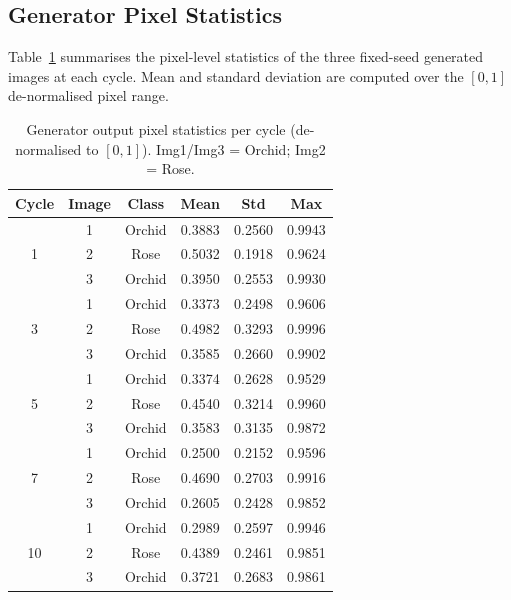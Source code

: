 \documentclass[conference]{IEEEtran}
\begin{document}
\subsection{Generator Pixel Statistics}
\label{ssec:pixel}

Table~\ref{tab:pixstats} summarises the pixel-level statistics of the three fixed-seed generated images at each cycle. Mean and standard deviation are computed over the $[0,1]$ de-normalised pixel range.

\begin{table}[h]
  \centering
  \caption{Generator output pixel statistics per cycle (de-normalised to $[0,1]$). Img1/Img3 = Orchid; Img2 = Rose.}
  \label{tab:pixstats}
  \begin{tabular}{cccccc}
    \toprule
    \textbf{Cycle} & \textbf{Image} & \textbf{Class} & \textbf{Mean} & \textbf{Std} & \textbf{Max} \\
    \midrule
    \multirow{3}{*}{1}  & 1 & Orchid & 0.3883 & 0.2560 & 0.9943 \\
                         & 2 & Rose   & 0.5032 & 0.1918 & 0.9624 \\
                         & 3 & Orchid & 0.3950 & 0.2553 & 0.9930 \\
    \midrule
    \multirow{3}{*}{3}  & 1 & Orchid & 0.3373 & 0.2498 & 0.9606 \\
                         & 2 & Rose   & 0.4982 & 0.3293 & 0.9996 \\
                         & 3 & Orchid & 0.3585 & 0.2660 & 0.9902 \\
    \midrule
    \multirow{3}{*}{5}  & 1 & Orchid & 0.3374 & 0.2628 & 0.9529 \\
                         & 2 & Rose   & 0.4540 & 0.3214 & 0.9960 \\
                         & 3 & Orchid & 0.3583 & 0.3135 & 0.9872 \\
    \midrule
    \multirow{3}{*}{7}  & 1 & Orchid & 0.2500 & 0.2152 & 0.9596 \\
                         & 2 & Rose   & 0.4690 & 0.2703 & 0.9916 \\
                         & 3 & Orchid & 0.2605 & 0.2428 & 0.9852 \\
    \midrule
    \multirow{3}{*}{10} & 1 & Orchid & 0.2989 & 0.2597 & 0.9946 \\
                         & 2 & Rose   & 0.4389 & 0.2461 & 0.9851 \\
                         & 3 & Orchid & 0.3721 & 0.2683 & 0.9861 \\
    \bottomrule
  \end{tabular}
\end{table}
\end{document}
